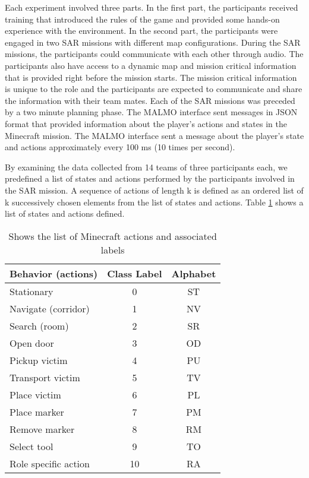 \documentclass{article}
\begin{document}
Each experiment involved three parts. In the first part, the participants received
training that introduced the rules of the game and provided some
hands-on experience with the environment. In the second part, the participants 
were engaged in two SAR missions with different map configurations. During the SAR
missions, the participants could communicate with each other through audio. The
participants also have access to a dynamic map and mission critical information that
is provided right before the mission starts. The mission critical information is unique
to the role and the participants are expected to communicate and share the information
with their team mates. Each of the SAR missions was preceded by a two minute planning
phase. The MALMO interface sent messages in JSON format that provided information about
the player's actions and states in the Minecraft mission. The MALMO interface sent 
a message about the player's state and actions approximately every 100 ms 
(10 times per second).

By examining the data collected from 14 teams of three participants each, we predefined
a list of states and actions performed by the participants involved in the SAR mission.
A sequence of actions of length k is defined as an ordered list of k successively chosen
elements from the list of states and actions. Table \ref{table:1} shows a list of states
and actions defined.

\begin{table}[h!]
    \centering
    \begin{tabular}{|l|c|c|}
    \hline
    \textbf{Behavior (actions)} & \textbf{Class Label} & \textbf{Alphabet} \\[1em]
    \hline
    Stationary & 0 & ST \\[0.5em]
    Navigate (corridor) & 1 & NV \\[0.5em]
    Search (room) & 2 & SR \\[0.5em]
    Open door & 3 & OD \\[0.5em]
    Pickup victim & 4 & PU \\[0.5em]
    Transport victim & 5 & TV \\[0.5em]
    Place victim & 6 & PL \\[0.5em]
    Place marker & 7 & PM \\[0.5em]
    Remove marker & 8 & RM \\[0.5em]
    Select tool & 9 & TO \\[0.5em]
    Role specific action & 10 & RA \\[0.5em]
    \hline
    \end{tabular}
    \caption{Shows the list of Minecraft actions and associated labels}
    \label{table:1}
\end{table}
\end{document}

